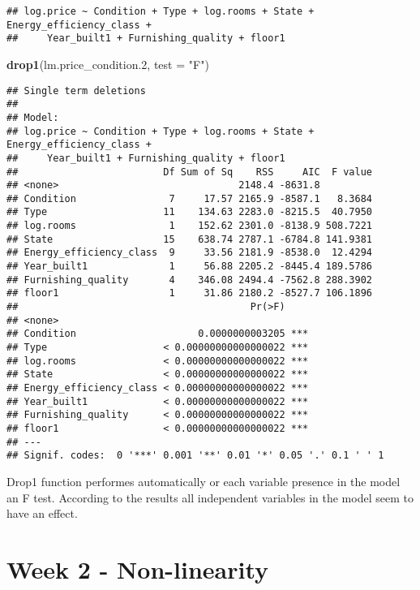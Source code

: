 \documentclass[
]{article}
\newenvironment{Shaded}{\begin{snugshade}}{\end{snugshade}}
\newcommand{\DataTypeTok}[1]{\textcolor[rgb]{0.13,0.29,0.53}{#1}}
\newcommand{\FloatTok}[1]{\textcolor[rgb]{0.00,0.00,0.81}{#1}}
\newcommand{\KeywordTok}[1]{\textcolor[rgb]{0.13,0.29,0.53}{\textbf{#1}}}
\newcommand{\NormalTok}[1]{#1}
\newcommand{\StringTok}[1]{\textcolor[rgb]{0.31,0.60,0.02}{#1}}
\begin{document}
\begin{verbatim}
## log.price ~ Condition + Type + log.rooms + State + Energy_efficiency_class + 
##     Year_built1 + Furnishing_quality + floor1
\end{verbatim}

\begin{Shaded}
\begin{Highlighting}[]
\KeywordTok{drop1}\NormalTok{(lm.price_condition}\FloatTok{.2}\NormalTok{, }\DataTypeTok{test =} \StringTok{"F"}\NormalTok{)}
\end{Highlighting}
\end{Shaded}

\begin{verbatim}
## Single term deletions
## 
## Model:
## log.price ~ Condition + Type + log.rooms + State + Energy_efficiency_class + 
##     Year_built1 + Furnishing_quality + floor1
##                         Df Sum of Sq    RSS     AIC  F value
## <none>                               2148.4 -8631.8         
## Condition                7     17.57 2165.9 -8587.1   8.3684
## Type                    11    134.63 2283.0 -8215.5  40.7950
## log.rooms                1    152.62 2301.0 -8138.9 508.7221
## State                   15    638.74 2787.1 -6784.8 141.9381
## Energy_efficiency_class  9     33.56 2181.9 -8538.0  12.4294
## Year_built1              1     56.88 2205.2 -8445.4 189.5786
## Furnishing_quality       4    346.08 2494.4 -7562.8 288.3902
## floor1                   1     31.86 2180.2 -8527.7 106.1896
##                                        Pr(>F)    
## <none>                                           
## Condition                     0.0000000003205 ***
## Type                    < 0.00000000000000022 ***
## log.rooms               < 0.00000000000000022 ***
## State                   < 0.00000000000000022 ***
## Energy_efficiency_class < 0.00000000000000022 ***
## Year_built1             < 0.00000000000000022 ***
## Furnishing_quality      < 0.00000000000000022 ***
## floor1                  < 0.00000000000000022 ***
## ---
## Signif. codes:  0 '***' 0.001 '**' 0.01 '*' 0.05 '.' 0.1 ' ' 1
\end{verbatim}

Drop1 function performes automatically or each variable presence in the
model an F test. According to the results all independent variables in
the model seem to have an effect.

\hypertarget{week-2---non-linearity}{%
\section{Week 2 - Non-linearity}\label{week-2---non-linearity}}
\end{document}
